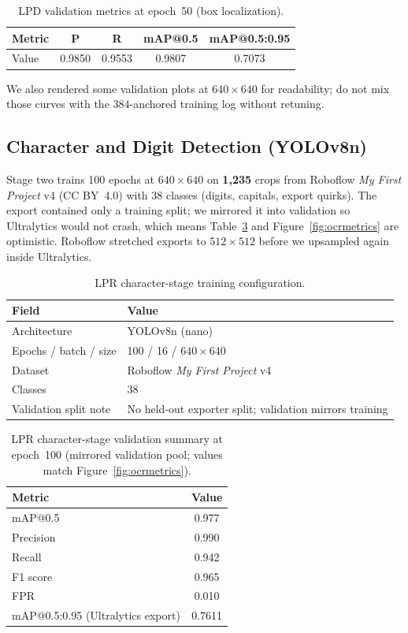 \documentclass[10pt, conference]{IEEEtran}
\begin{document}
\begin{table}[!htbp]
\centering
\caption{LPD validation metrics at epoch~50 (box localization).}
\label{tab:lpdmetrics}
\begin{tabular}{@{}lcccc@{}}
\toprule
Metric & P & R & mAP@0.5 & mAP@0.5:0.95 \\
\midrule
Value & 0.9850 & 0.9553 & 0.9807 & 0.7073 \\
\bottomrule
\end{tabular}
\end{table}

We also rendered some validation plots at $640\times640$ for readability; do not mix those curves with the $384$-anchored training log without retuning.

\subsection{Character and Digit Detection (YOLOv8n)}
\label{subsec:lpchar}
Stage two trains 100 epochs at $640\times640$ on \textbf{1{,}235} crops from Roboflow \emph{My First Project} v4 (CC BY~4.0) with 38 classes (digits, capitals, export quirks). The export contained only a training split; we mirrored it into validation so Ultralytics would not crash, which means Table~\ref{tab:lpcharmetrics} and Figure~\ref{fig:ocrmetrics} are optimistic. Roboflow stretched exports to $512\times512$ before we upsampled again inside Ultralytics.

\begin{table}[!htbp]
\centering
\caption{LPR character-stage training configuration.}
\label{tab:lpchartrain}
\begin{tabular}{@{}ll@{}}
\toprule
Field & Value \\
\midrule
Architecture & YOLOv8n (nano) \\
Epochs / batch / size & 100 / 16 / $640\times640$ \\
Dataset & Roboflow \emph{My First Project} v4 \\
Classes & 38 \\
Validation split note & No held-out exporter split; validation mirrors training \\
\bottomrule
\end{tabular}
\end{table}

\begin{table}[!htbp]
\centering
\caption{LPR character-stage validation summary at epoch~100 (mirrored validation pool; values match Figure~\ref{fig:ocrmetrics}).}
\label{tab:lpcharmetrics}
\begin{tabular}{@{}lc@{}}
\toprule
Metric & Value \\
\midrule
mAP@0.5 & 0.977 \\
Precision & 0.990 \\
Recall & 0.942 \\
F1 score & 0.965 \\
FPR & 0.010 \\
mAP@0.5:0.95 (Ultralytics export) & 0.7611 \\
\bottomrule
\end{tabular}
\end{table}
\end{document}
